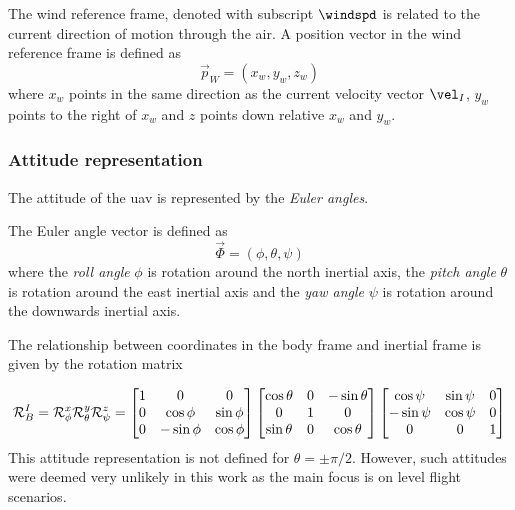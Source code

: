 \begin{definition}
    The wind reference frame, denoted with subscript $\windspd$ is related to the current direction of motion
    through the air.
    A position vector in the wind reference frame is defined as
    \begin{equation}
        \vec{p}_W = (x_w, y_w, z_w)
    \end{equation}
    where $x_w$ points in the same direction as the current velocity vector $\vel_I$, 
    $y_w$ points to the right of $x_w$ and $z$ points down relative $x_w$ and $y_w$.
\end{definition}

\subsubsection{Attitude representation}
The attitude of the \ac{uav} is represented by the \textit{Euler angles}. 

\begin{definition}
The Euler angle vector is defined as
\begin{equation}
    \vec{\Phi}=(\phi, \theta, \psi)
\end{equation}
where the \textit{roll angle} $\phi$ is rotation around the north inertial axis, 
the \textit{pitch angle} $\theta$ is rotation around the east inertial axis and
the \textit{yaw angle} $\psi$ is rotation around the downwards inertial axis.
\end{definition}

The relationship between coordinates in the body frame and inertial frame is given
 by the rotation matrix

\begin{equation}\label{eq:r_i_b}
\mathcal{R}^I_B = \mathcal{R}^x_\phi\mathcal{R}^y_\theta\mathcal{R}^z_\psi\\
=
\begin{bmatrix}
    1 & 0 & 0 \\
    0 & \cos\phi & \sin\phi \\
    0 & -\sin\phi & \cos\phi
\end{bmatrix}
\begin{bmatrix}
    \cos\theta & 0 & -\sin\theta \\
    0 & 1 & 0 \\
    \sin\theta & 0 & \cos\theta
\end{bmatrix}      
\begin{bmatrix}
    \cos\psi & \sin\psi & 0 \\
    -\sin\psi & \cos\psi & 0 \\
    0 & 0 & 1
\end{bmatrix}
\end{equation}  
This attitude representation is not defined for $\theta=\pm\pi/2$. However, such attitudes
 were deemed very unlikely in this work as the main focus is on level flight scenarios.

